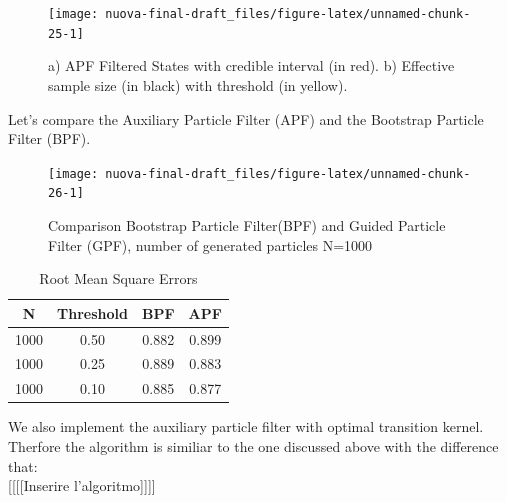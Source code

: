 \documentclass[
]{book}
\theoremstyle{break}
\theoremstyle{nonumberplain}
\begin{document}
\begin{figure}[H]

{\centering \texttt{[image: nuova-final-draft\_files/figure-latex/unnamed-chunk-25-1]} 

}

\caption{a) APF Filtered States with credible interval (in red). b) Effective sample size (in black) with threshold (in yellow).}\label{fig:unnamed-chunk-25}
\end{figure}

Let's compare the Auxiliary Particle Filter (APF) and the Bootstrap
Particle Filter (BPF).

\begin{figure}[H]

{\centering \texttt{[image: nuova-final-draft\_files/figure-latex/unnamed-chunk-26-1]} 

}

\caption{Comparison Bootstrap Particle Filter(BPF) and Guided Particle Filter (GPF), number of generated particles N=1000}\label{fig:unnamed-chunk-26}
\end{figure}

\begin{longtable}[t]{cccc}
\caption{\label{tab:unnamed-chunk-28}Root Mean Square Errors}\\
\toprule
N & Threshold & BPF & APF\\
\midrule
1000 & 0.50 & 0.882 & 0.899\\
1000 & 0.25 & 0.889 & 0.883\\
1000 & 0.10 & 0.885 & 0.877\\
\bottomrule
\end{longtable}

We also implement the auxiliary particle filter with optimal transition
kernel. Therfore the algorithm is similiar to the one discussed above
with the difference that:\\
{[}{[}{[}{[}Inserire l'algoritmo{]}{]}{]}{]}
\end{document}
